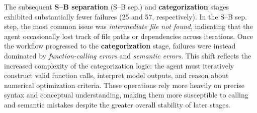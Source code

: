 \documentclass[aps,prd,reprint,superscriptaddress]{revtex4-2}
\begin{document}

The subsequent \textbf{S–B separation} (S--B sep.) and \textbf{categorization} stages exhibited substantially fewer failures (25 and 57, respectively). In the S--B sep. step, the most common issue was \textit{intermediate file not found}, indicating that the agent occasionally lost track of file paths or dependencies across iterations. Once the workflow progressed to the \textbf{categorization} stage, failures were instead dominated by \textit{function-calling errors} and \textit{semantic errors}. This shift reflects the increased complexity of the categorization logic: the agent must iteratively construct valid function calls, interpret model outputs, and reason about numerical optimization criteria. These operations rely more heavily on precise syntax and conceptual understanding, making them more susceptible to calling and semantic mistakes despite the greater overall stability of later stages.
\end{document}
